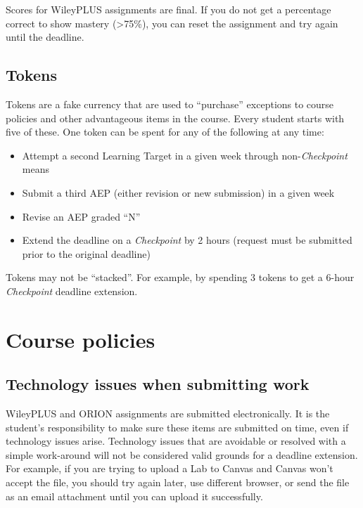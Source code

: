 Scores for WileyPLUS assignments are final. If you do not get a
percentage correct to show mastery (\textgreater75\%), you can reset the
assignment and try again until the deadline.

\hypertarget{tokens}{%
\subsection{Tokens}\label{tokens}}

Tokens are a fake currency that are used to ``purchase'' exceptions to
course policies and other advantageous items in the course. Every
student starts with five of these. One token can be spent for any of the
following at any time:

\begin{itemize}
\tightlist
\item
  Attempt a second Learning Target in a given week through
  non-\emph{Checkpoint} means
\item
  Submit a third AEP (either revision or new submission) in a given week
\item
  Revise an AEP graded ``N''
\item
  Extend the deadline on a \emph{Checkpoint} by 2 hours (request must be
  submitted prior to the original deadline)
\end{itemize}

Tokens may not be ``stacked''. For example, by spending 3 tokens to get
a 6-hour \emph{Checkpoint} deadline extension.

\hypertarget{course-policies}{%
\section{Course policies}\label{course-policies}}

\hypertarget{technology-issues-when-submitting-work}{%
\subsection{Technology issues when submitting
work}\label{technology-issues-when-submitting-work}}

WileyPLUS and ORION assignments are submitted electronically. It is the
student's responsibility to make sure these items are submitted on time,
even if technology issues arise. Technology issues that are avoidable or
resolved with a simple work-around will not be considered valid grounds
for a deadline extension. For example, if you are trying to upload a Lab
to Canvas and Canvas won't accept the file, you should try again later,
use different browser, or send the file as an email attachment until you
can upload it successfully.

